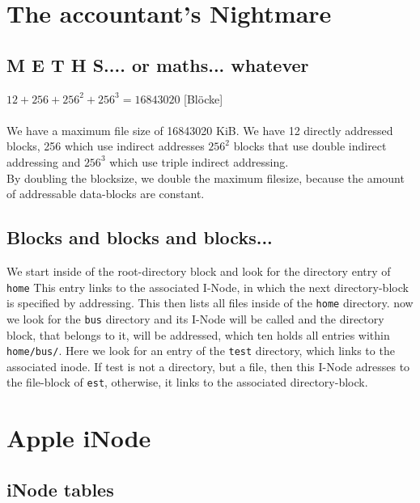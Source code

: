 \documentclass[a4paper, 11pt]{article}
\begin{document}
    \section{The accountant's Nightmare}
    \subsection{M E T H S.... or maths... whatever}
    $12 + 256 + 256^2 +256^3 = 16843020$ [Blöcke] \\\\
    
    We have a maximum file size of 16843020 KiB. We have 12 directly addressed blocks, 256 which use indirect addresses $256^2$ blocks that use double indirect addressing and $256^3$ which use triple indirect addressing.\\
    By doubling the blocksize, we double the maximum filesize, because the amount of addressable data-blocks are constant.

    \subsection{Blocks and blocks and blocks...}
    We start inside of the root-directory block and look for the directory entry of \texttt{home}
    This entry links to the associated I-Node, in which the next directory-block is specified by addressing. 
    This then lists all files inside of the \texttt{home} directory. now we look for the \texttt{bus} directory and its I-Node will be called and the directory block, that belongs to it, will be addressed, which ten holds all entries within \texttt{home/bus/}.
    Here we look for an entry of the \texttt{test} directory, which links to the associated inode.
    If test is not a directory, but a file, then this I-Node adresses to the file-block of \texttt{est}, otherwise, it links to the associated directory-block.
    \newpage
    \section{Apple iNode}
    \subsection{iNode tables}
\end{document}
